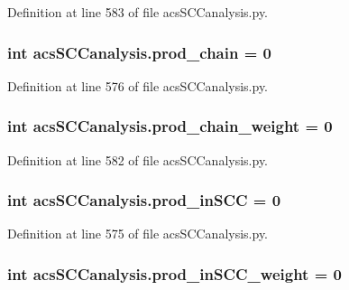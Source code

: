 Definition at line 583 of file acs\+S\+C\+Canalysis.\+py.

\hypertarget{a00130_ab307c6047e4d16ec0335266b24e7db5a}{
\subsubsection[{prod\+\_\+chain}]{\setlength{\rightskip}{0pt plus 5cm}int acs\+S\+C\+Canalysis.\+prod\+\_\+chain = 0}}\label{a00130_ab307c6047e4d16ec0335266b24e7db5a}


Definition at line 576 of file acs\+S\+C\+Canalysis.\+py.

\hypertarget{a00130_a6736365f1f19058f6e1d57287383dbcc}{
\subsubsection[{prod\+\_\+chain\+\_\+weight}]{\setlength{\rightskip}{0pt plus 5cm}int acs\+S\+C\+Canalysis.\+prod\+\_\+chain\+\_\+weight = 0}}\label{a00130_a6736365f1f19058f6e1d57287383dbcc}


Definition at line 582 of file acs\+S\+C\+Canalysis.\+py.

\hypertarget{a00130_adbc76b0558ceb74d798b35146a583474}{
\subsubsection[{prod\+\_\+in\+S\+C\+C}]{\setlength{\rightskip}{0pt plus 5cm}int acs\+S\+C\+Canalysis.\+prod\+\_\+in\+S\+C\+C = 0}}\label{a00130_adbc76b0558ceb74d798b35146a583474}


Definition at line 575 of file acs\+S\+C\+Canalysis.\+py.

\hypertarget{a00130_aa22adccedd9ae548d0687df507ebd92d}{
\subsubsection[{prod\+\_\+in\+S\+C\+C\+\_\+weight}]{\setlength{\rightskip}{0pt plus 5cm}int acs\+S\+C\+Canalysis.\+prod\+\_\+in\+S\+C\+C\+\_\+weight = 0}}\label{a00130_aa22adccedd9ae548d0687df507ebd92d}


